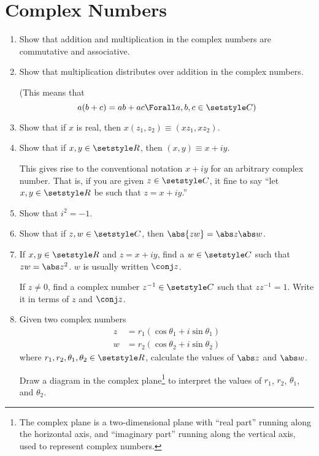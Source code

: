 \section{Complex Numbers}

\begin{enumerate}
 \item
  Show that addition and multiplication in the complex numbers are commutative
  and associative.
 \item
  Show that multiplication distributes over addition in the complex numbers.

  (This means that
  \begin{equation*}
   a(b + c) = ab + ac \Forall a, b, c \in \Complex)
  \end{equation*}
 \item
  Show that if \(x\) is real, then \(x(z_1, z_2) \equiv (x z_1, x z_2)\).
 \item
  Show that if \(x, y \in \Reals\), then \((x, y) \equiv x + i y\).

  This gives rise to the conventional notation \(x + iy\) for an arbitrary
  complex number. That is, if you are given \(z \in \Complex\), it fine to say
  ``let \(x, y \in \Reals\) be such that \(z = x + iy\).''
 \item
  Show that \(i^2 = -1\).
 \item
  Show that if \(z, w \in \Complex\), then \(\abs{zw} = \abs z \abs w\).
 \item
  If \(x, y \in \Reals\) and \(z = x + iy\), find a \(w \in \Complex\) such that
  \(zw = \abs z^2\). \(w\) is usually written \(\conj z\).

  If \(z \ne 0\), find a complex number \(z^{-1} \in \Complex\) such that
  \(zz^{-1} = 1\). Write it in terms of \(z\) and \(\conj z\).
 \item \label{q_compl_args}
  Given two complex numbers
  \begin{align*}
   z &= r_1(\cos \theta_1 + i \sin \theta_1) \\
   w &= r_2(\cos \theta_2 + i \sin \theta_2)
  \end{align*}
  where \(r_1, r_2, \theta_1, \theta_2 \in \Reals\),
  calculate the values of \(\abs z\) and \(\abs w\).

  Draw a diagram in the complex plane\footnote{
   The complex plane is a two-dimensional plane with ``real part'' running along
   the horizontal axis, and ``imaginary part'' running along the vertical axis,
   used to represent complex numbers.
  } to interpret the values of \(r_1\), \(r_2\), \(\theta_1\), and \(\theta_2\).


\end{enumerate}
